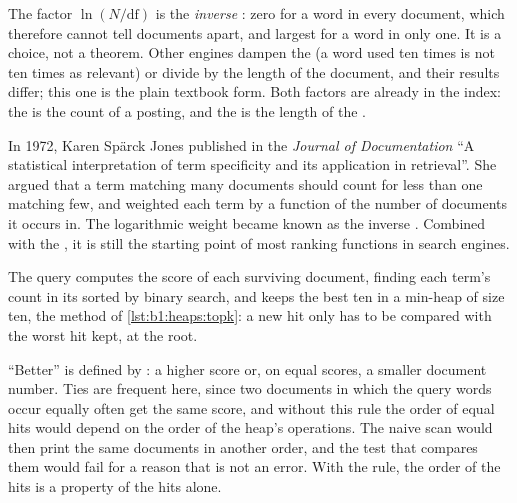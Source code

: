 The factor $\ln (N / \mathrm{df})$ is the \emph{inverse }: zero for a word in every document, which
therefore cannot tell documents apart, and largest for a word in only one. It is a choice, not a theorem. Other
engines dampen the  (a word used ten times is not ten times as relevant) or divide by the length of the
document, and their results differ; this one is the plain textbook form. Both factors are already in the index: the
 is the count of a posting, and the  is the length of the .

\begin{history}
In 1972, Karen Spärck Jones published in the \emph{Journal of Documentation} ``A statistical interpretation of term
specificity and its application in retrieval''. She argued that a term matching many documents should count for
less than one matching few, and weighted each term by a function of the number of documents it occurs in. The
logarithmic weight became known as the inverse . Combined with the , it is still the
starting point of most ranking functions in search engines.
\end{history}

The query computes the score of each surviving document, finding each term's count in its sorted  by
binary search, and keeps the best ten in a min-heap of size ten, the method of \cref{lst:b1:heaps:topk}: a new hit only
has to be compared with the worst hit kept, at the root.

\label{lst:b1:project-text-search-engine:topk}

``Better'' is defined by : a higher score or, on equal scores, a smaller document number. Ties are
frequent here, since two documents in which the query words occur equally often get the same score, and without this
rule the order of equal hits would depend on the order of the heap's operations. The naive scan would then print the
same documents in another order, and the test that compares them would fail for a reason that is not an error.
With the rule, the order of the hits is a property of the hits alone.

